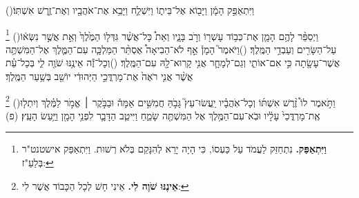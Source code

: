 \documentclass[12pt, openany]{book}
\newcommand{\footnotecomment}[1]{
	\renewcommand\thefootnote{}
	\footnote{\textsf{#1}}}
\newcommand{\commenta}[1]{\footnotecomment{#1}\hspace{0em}}
\newcommand{\vsnum}[1]{(\hebrewnumeral{#1})\space}
\begin{document}
\begin{multicols}{2}
\vsnum{10}וַיִּתְאַפַּ֣ק הָמָ֔ן וַיָּב֖וֹא אֶל־בֵּית֑וֹ וַיִּשְׁלַ֛ח וַיָּבֵ֥א אֶת־אֹהֲבָ֖יו וְאֶת־זֶ֥רֶשׁ אִשְׁתּֽוֹ׃%
\commenta{\textrm{\textbf{וַיִּתְאַפַּק.}} נִתְחַזֵּק לַעֲמֹד עַל כַּעְסוֹ, כִּי הָיָה יָרֵא לְהִנָּקֵם בְּלֹא רְשׁוּת. וַיִּתְאַפַּק אישטנט"ר בְּלַעַ"ז: }%
\vsnum{11}וַיְסַפֵּ֨ר לָהֶ֥ם הָמָ֛ן אֶת־כְּב֥וֹד עָשְׁר֖וֹ וְרֹ֣ב בָּנָ֑יו וְאֵת֩ כָּל־אֲשֶׁ֨ר גִּדְּל֤וֹ הַמֶּ֙לֶךְ֙ וְאֵ֣ת אֲשֶׁ֣ר נִשְּׂא֔וֹ עַל־הַשָּׂרִ֖ים וְעַבְדֵ֥י הַמֶּֽלֶךְ׃
\vsnum{12}וַיֹּאמֶר֮ הָמָן֒ אַ֣ף לֹא־הֵבִיאָה֩ אֶסְתֵּ֨ר הַמַּלְכָּ֧ה עִם־הַמֶּ֛לֶךְ אֶל־הַמִּשְׁתֶּ֥ה אֲשֶׁר־עָשָׂ֖תָה כִּ֣י אִם־אוֹתִ֑י וְגַם־לְמָחָ֛ר אֲנִ֥י קָֽרוּא־לָ֖הּ עִם־הַמֶּֽלֶךְ׃
\vsnum{13}וְכָל־זֶ֕ה אֵינֶ֥נּוּ שֹׁוֶ֖ה לִ֑י בְּכָל־עֵ֗ת אֲשֶׁ֨ר אֲנִ֤י רֹאֶה֙ אֶת־מָרְדֳּכַ֣י הַיְּהוּדִ֔י יוֹשֵׁ֖ב בְּשַׁ֥עַר הַמֶּֽלֶךְ׃%
\commenta{\textrm{\textbf{אֵינֶנּוּ שֹׁוֶה לִי.}} אֵינִי חָשׁ לְכָל הַכָּבוֹד אֲשֶׁר לִי:}%
\vsnum{14}וַתֹּ֣אמֶר לוֹ֩ זֶ֨רֶשׁ אִשְׁתּ֜וֹ וְכָל־אֹֽהֲבָ֗יו יַֽעֲשׂוּ־עֵץ֮ גָּבֹ֣הַּ חֲמִשִּׁ֣ים אַמָּה֒ וּבַבֹּ֣קֶר ׀ אֱמֹ֣ר לַמֶּ֗לֶךְ וְיִתְל֤וּ אֶֽת־מָרְדֳּכַי֙ עָלָ֔יו וּבֹֽא־עִם־הַמֶּ֥לֶךְ אֶל הַמִּשְׁתֶּ֖ה שָׂמֵ֑חַ וַיִּיטַ֧ב הַדָּבָ֛ר לִפְנֵ֥י הָמָ֖ן וַיַּ֥עַשׂ הָעֵֽץ׃ (פ)
\end{multicols}\newpage
\end{document}
